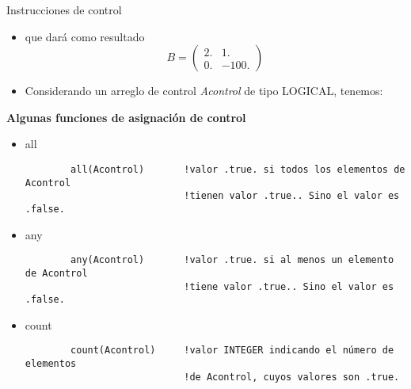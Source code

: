 \begin{frame}[fragile]{Instrucciones de control} 
    \begin{itemize}[<+(0)->]
        \item [] que dará como resultado
            $$
                B = \left( \begin{array}{cc}
                    2. & 1. \\
                    0. & -100. \end{array} \right)
            $$
        \item Considerando un arreglo de control \emph{Acontrol} de tipo LOGICAL, tenemos:
    \end{itemize}
    \textbf{Algunas funciones de asignación de control}
    \begin{itemize}[<+(1)->]
        \item all \\ 
        \begin{verbatim}
        all(Acontrol)       !valor .true. si todos los elementos de Acontrol
                            !tienen valor .true.. Sino el valor es .false.
        \end{verbatim}
        \item any \\ 
        \begin{verbatim}
        any(Acontrol)       !valor .true. si al menos un elemento de Acontrol
                            !tiene valor .true.. Sino el valor es .false.
        \end{verbatim}
        \item count \\ 
        \begin{verbatim}
        count(Acontrol)     !valor INTEGER indicando el número de elementos 
                            !de Acontrol, cuyos valores son .true.
        \end{verbatim}                         
    \end{itemize}
\end{frame}



